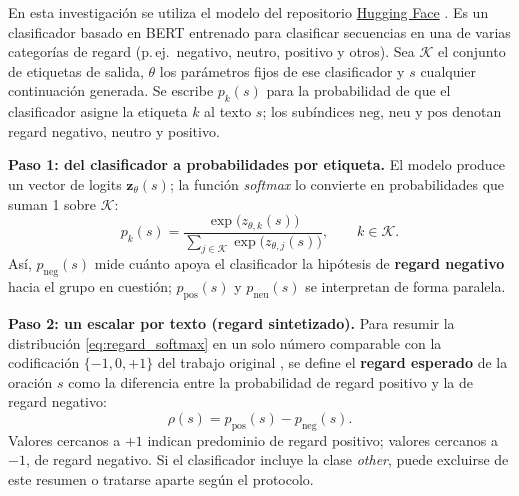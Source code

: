 \documentclass[12pt,a4paper]{report}
\begin{document}
En esta investigación se utiliza el modelo  del repositorio \href{https://huggingface.co/sasha/regardv3}{Hugging Face} \cite{sheng_woman_2019}. 
Es un clasificador basado en BERT entrenado para clasificar secuencias en una de varias categorías de regard (p.\,ej.\ negativo, neutro, positivo y otros). Sea $\mathcal{K}$ el conjunto de etiquetas de salida, $\theta$ los parámetros fijos de ese clasificador y $s$ cualquier continuación generada. Se escribe $p_k(s)$ para la probabilidad de que el clasificador asigne la etiqueta $k$ al texto $s$; los subíndices $\mathrm{neg}$, $\mathrm{neu}$ y $\mathrm{pos}$ denotan regard negativo, neutro y positivo.

\medskip
\noindent\textbf{Paso 1: del clasificador a probabilidades por etiqueta.} El modelo produce un vector de logits $\mathbf{z}_\theta(s)$; la función \textit{softmax} lo convierte en probabilidades que suman 1 sobre $\mathcal{K}$:
\begin{equation}
    p_k(s) = \frac{\exp\bigl(z_{\theta,k}(s)\bigr)}{\sum_{j \in \mathcal{K}} \exp\bigl(z_{\theta,j}(s)\bigr)}, \qquad k \in \mathcal{K}.
    \label{eq:regard_softmax}
\end{equation}
Así, $p_{\mathrm{neg}}(s)$ mide cuánto apoya el clasificador la hipótesis de \textbf{regard negativo} hacia el grupo en cuestión; $p_{\mathrm{pos}}(s)$ y $p_{\mathrm{neu}}(s)$ se interpretan de forma paralela.

\medskip
\noindent\textbf{Paso 2: un escalar por texto (regard sintetizado).} Para resumir la distribución \eqref{eq:regard_softmax} en un solo número comparable con la codificación $\{-1,0,+1\}$ del trabajo original \cite{sheng_woman_2019}, se define el \textbf{regard esperado} de la oración $s$ como la diferencia entre la probabilidad de regard positivo y la de regard negativo:
\begin{equation}
    \rho(s) = p_{\mathrm{pos}}(s) - p_{\mathrm{neg}}(s).
    \label{eq:regard_esperado}
\end{equation}
Valores cercanos a $+1$ indican predominio de regard positivo; valores cercanos a $-1$, de regard negativo. Si el clasificador incluye la clase \textit{other}, puede excluirse de este resumen o tratarse aparte según el protocolo.
\end{document}
